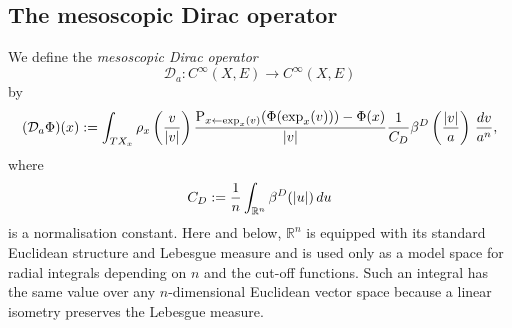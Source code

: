 \documentclass[a4paper,oneside,12pt]{amsart}
\theoremstyle{plain}
\theoremstyle{definition}
\theoremstyle{remark}
\newcommand{\R}{\mathbb{R}}
\DeclarePairedDelimiter{\abs}{\lvert}{\rvert}
\newcommand{\paralleltransport}[2]{\operatorname{P}_{#2 \gets #1}}
\newcommand{\cliffordmultiplication}{\rho}
\newcommand{\mesoscopicDiracoperator}[1][a]{\mathcal{D}_{#1}}
\newcommand{\cutoff}{\beta}
\newcommand{\cutoffDirac}{\cutoff^D}
\begin{document}
\subsection{The mesoscopic Dirac operator}

We define the \emph{mesoscopic Dirac operator}
\begin{equation}
  \mesoscopicDiracoperator \colon C^{\infty}(X,E) \to C^{\infty}(X,E)
\end{equation}
by
\begin{equation}
  (\mesoscopicDiracoperator \Phi)(x) := \int_{TX_x} \cliffordmultiplication_x\left(\frac{v}{\abs{v}}\right) \frac{\paralleltransport{\exp_x(v)}{x}(\Phi(\exp_x(v))) - \Phi(x)}{\abs{v}} \frac{1}{C_D} \cutoffDirac\left(\frac{\abs{v}}{a}\right)\,\frac{dv}{a^n},
\end{equation}
where
\begin{equation}
  C_D := \frac{1}{n} \int_{\R^n} \cutoffDirac(\abs{u}) \,du
\end{equation}
is a normalisation constant.
Here and below, $\R^n$ is equipped with its standard Euclidean structure and Lebesgue measure and is used only as a model space for radial integrals depending on $n$ and the cut-off functions.
Such an integral has the same value over any $n$-dimensional Euclidean vector space because a linear isometry preserves the Lebesgue measure.
\end{document}
